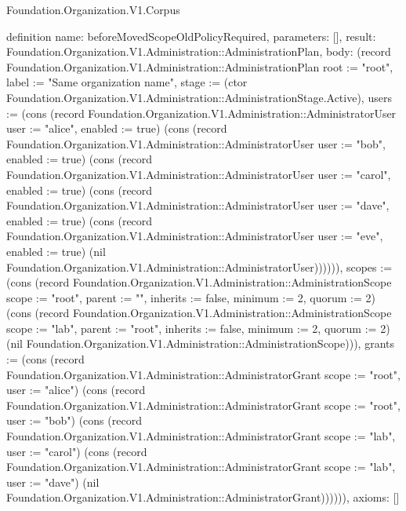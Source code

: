 \begin{lexlean}{Foundation.Organization.V1.Corpus}
\begin{semanticmodule}
definition{
  name: beforeMovedScopeOldPolicyRequired,
  parameters: [],
  result: Foundation.Organization.V1.Administration::AdministrationPlan,
  body: (record Foundation.Organization.V1.Administration::AdministrationPlan {root := "root", label := "Same organization name", stage := (ctor Foundation.Organization.V1.Administration::AdministrationStage.Active), users := (cons (record Foundation.Organization.V1.Administration::AdministratorUser {user := "alice", enabled := true}) (cons (record Foundation.Organization.V1.Administration::AdministratorUser {user := "bob", enabled := true}) (cons (record Foundation.Organization.V1.Administration::AdministratorUser {user := "carol", enabled := true}) (cons (record Foundation.Organization.V1.Administration::AdministratorUser {user := "dave", enabled := true}) (cons (record Foundation.Organization.V1.Administration::AdministratorUser {user := "eve", enabled := true}) (nil Foundation.Organization.V1.Administration::AdministratorUser)))))), scopes := (cons (record Foundation.Organization.V1.Administration::AdministrationScope {scope := "root", parent := "", inherits := false, minimum := 2, quorum := 2}) (cons (record Foundation.Organization.V1.Administration::AdministrationScope {scope := "lab", parent := "root", inherits := false, minimum := 2, quorum := 2}) (nil Foundation.Organization.V1.Administration::AdministrationScope))), grants := (cons (record Foundation.Organization.V1.Administration::AdministratorGrant {scope := "root", user := "alice"}) (cons (record Foundation.Organization.V1.Administration::AdministratorGrant {scope := "root", user := "bob"}) (cons (record Foundation.Organization.V1.Administration::AdministratorGrant {scope := "lab", user := "carol"}) (cons (record Foundation.Organization.V1.Administration::AdministratorGrant {scope := "lab", user := "dave"}) (nil Foundation.Organization.V1.Administration::AdministratorGrant)))))}),
  axioms: []
}


\end{semanticmodule}
\end{lexlean}

